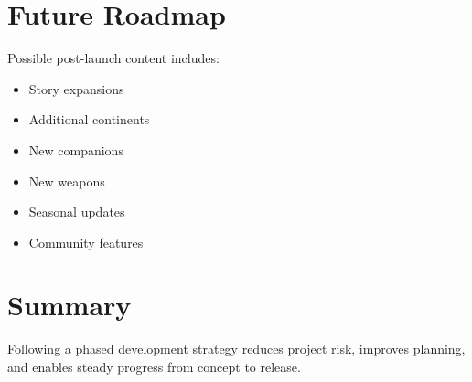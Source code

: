 \section{Future Roadmap}

Possible post-launch content includes:

\begin{itemize}
    \item Story expansions
    \item Additional continents
    \item New companions
    \item New weapons
    \item Seasonal updates
    \item Community features
\end{itemize}

\section{Summary}

Following a phased development strategy reduces project risk, improves planning, and enables steady progress from concept to release.
